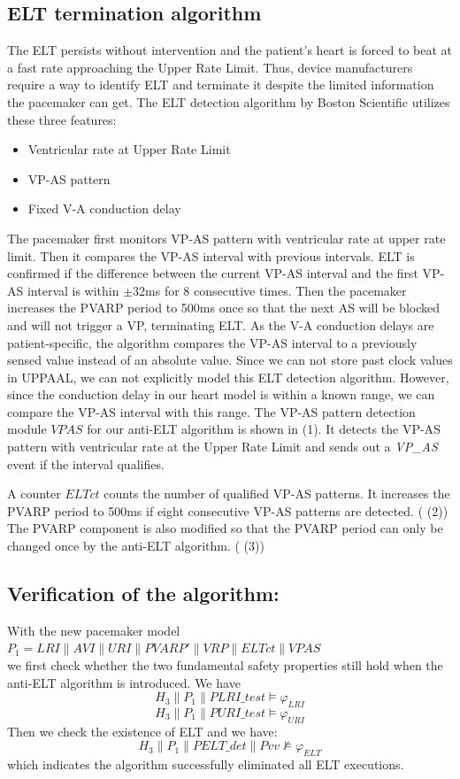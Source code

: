 \subsection{ELT termination algorithm} 
The ELT persists without intervention and the patient's heart is forced to beat at a fast rate approaching the Upper Rate Limit. Thus, device manufacturers require a way to identify ELT and terminate it despite the limited information the pacemaker can get. The ELT detection algorithm by Boston Scientific \cite{challenge} utilizes these three features:
\vspace{-5pt}
\begin{itemize}
  \item Ventricular rate at Upper Rate Limit
	\item VP-AS pattern
	\item Fixed V-A conduction delay
\end{itemize}
The pacemaker first monitors VP-AS pattern with ventricular rate at upper rate limit. Then it compares the VP-AS interval with previous intervals. ELT is confirmed if the difference between the current VP-AS interval and the first VP-AS interval is within $\pm$32ms for 8 consecutive times. Then the pacemaker increases the PVARP period to 500ms once so that the next AS will be blocked and will not trigger a VP, terminating ELT.
As the V-A conduction delays are patient-specific, the algorithm compares the VP-AS interval to a previously sensed value instead of an absolute value. Since we can not store past clock values in UPPAAL, we can not explicitly model this ELT detection algorithm. However, since the conduction delay in our heart model is within a known range, we can compare the VP-AS interval with this range. The VP-AS pattern detection module $VPAS$ for our anti-ELT algorithm is shown in  (1). It detects the VP-AS pattern with ventricular rate at the Upper Rate Limit and sends out a \emph{VP\_AS} event if the interval qualifies. 

A counter $ELTct$ counts the number of qualified VP-AS patterns. It increases the PVARP period to 500ms if eight consecutive VP-AS patterns are detected. ( (2)) The PVARP component is also modified so that the PVARP period can only be changed once by the anti-ELT algorithm. ( (3))

\subsection{Verification of the algorithm: }
With the new pacemaker model\\ 
$P_1=LRI\|AVI\|URI\|PVARP'\|VRP\|ELTct\|VPAS$\\
we first check whether the two fundamental safety properties still hold when the anti-ELT algorithm is introduced. We have 
$$H_3\|P_1\|PLRI\_test\models\varphi_{LRI}$$
$$H_3\|P_1\|PURI\_test\models\varphi_{URI}$$
Then we check the existence of ELT and we have:
$$H_3\|P_1\|PELT\_det\|Pvv\not\models\varphi_{ELT}$$
which indicates the algorithm successfully eliminated all ELT executions.
